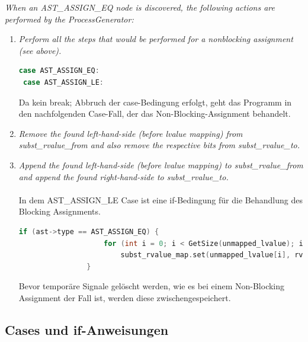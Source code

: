 \documentclass[11pt]{report}
\begin{document}
\textit{When an AST\_ASSIGN\_EQ node is discovered, the following actions are performed by the ProcessGenerator:}
\begin{enumerate}
  \item \textit{Perform all the steps that would be performed for a nonblocking assignment (see above).}
\begin{lstlisting}[language=C++]
 case AST_ASSIGN_EQ:
 case AST_ASSIGN_LE:		
\end{lstlisting}
  Da kein break; Abbruch der case-Bedingung erfolgt, geht das Programm in den nachfolgenden Case-Fall, der das Non-Blocking-Assignment behandelt.
\item \textit{Remove the found left-hand-side (before lvalue mapping) from subst\_rvalue\_from and also remove the respective bits from subst\_rvalue\_to.}

\item \textit{Append the found left-hand-side (before lvalue mapping) to subst\_rvalue\_from and append the found right-hand-side to subst\_rvalue\_to.}
\\
\\
In dem AST\_ASSIGN\_LE Case ist eine if-Bedingung für die Behandlung des Blocking Assignments.

\begin{lstlisting}[language=C++]
if (ast->type == AST_ASSIGN_EQ) {
					for (int i = 0; i < GetSize(unmapped_lvalue); i++)
						subst_rvalue_map.set(unmapped_lvalue[i], rvalue[i]);
				}
\end{lstlisting}

Bevor temporäre Signale gelöscht werden, wie es bei einem Non-Blocking Assignment der Fall ist, werden diese zwischengespeichert.

\end{enumerate}

\subsection{Cases und if-Anweisungen}
\end{document}
